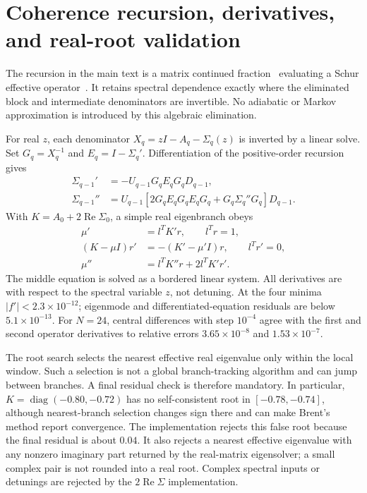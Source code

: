 \documentclass[aps,pra,10pt,onecolumn,superscriptaddress,amsmath,amssymb]{revtex4-2}
\begin{document}
\section{Coherence recursion, derivatives, and real-root validation}
The recursion in the main text is a matrix continued fraction~\cite{GarciaPalaciosZueco2006} evaluating a Schur effective operator~\cite{FSElimination2020}. It retains spectral dependence exactly where the eliminated block and intermediate denominators are invertible. No adiabatic or Markov approximation is introduced by this algebraic elimination.

For real $z$, each denominator $X_q=zI-A_q-\Sigma_q(z)$ is inverted by a linear solve. Set $G_q=X_q^{-1}$ and $E_q=I-\Sigma_q'$. Differentiation of the positive-order recursion gives
\begin{align}
 \Sigma_{q-1}'&=-U_{q-1}G_qE_qG_qD_{q-1},\\
 \Sigma_{q-1}''&=U_{q-1}\left[2G_qE_qG_qE_qG_q+G_q\Sigma_q''G_q\right]D_{q-1}.
\end{align}
With $K=A_0+2\operatorname{Re}\Sigma_0$, a simple real eigenbranch obeys
\begin{align}
 \mu'&=l^TK'r,\qquad l^Tr=1,\\
 (K-\mu I)r'&=-(K'-\mu'I)r,\qquad l^Tr'=0,\\
 \mu''&=l^TK''r+2l^TK'r'.
\end{align}
The middle equation is solved as a bordered linear system. All derivatives are with respect to the spectral variable $z$, not detuning. At the four minima $|f'|<2.3\times10^{-12}$; eigenmode and differentiated-equation residuals are below $5.1\times10^{-13}$. For $N=24$, central differences with step $10^{-4}$ agree with the first and second operator derivatives to relative errors $3.65\times10^{-8}$ and $1.53\times10^{-7}$.

The root search selects the nearest effective real eigenvalue only within the local window. Such a selection is not a global branch-tracking algorithm and can jump between branches. A final residual check is therefore mandatory. In particular, $K=\operatorname{diag}(-0.80,-0.72)$ has no self-consistent root in $[-0.78,-0.74]$, although nearest-branch selection changes sign there and can make Brent's method report convergence. The implementation rejects this false root because the final residual is about $0.04$. It also rejects a nearest effective eigenvalue with any nonzero imaginary part returned by the real-matrix eigensolver; a small complex pair is not rounded into a real root. Complex spectral inputs or detunings are rejected by the $2\operatorname{Re}\Sigma$ implementation.
\end{document}
